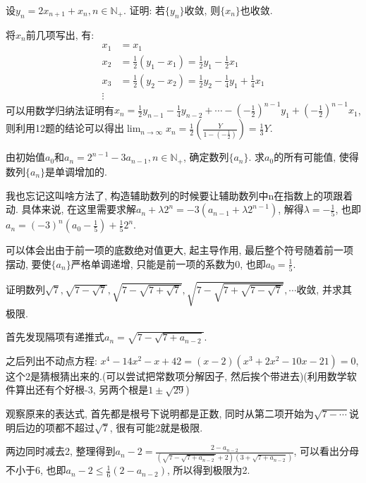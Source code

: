      \begin{exercise}
         设$y_n=2x_{n+1}+x_n, n\in \mathbb{N}_+$. 证明: 若$\{y_n\}$收敛, 则$\{x_n\}$也收敛.
     \end{exercise}
     \begin{solution}
         将$x_n$前几项写出, 有:
         \begin{align*}
             x_1 & =x_1                                                               \\
             x_2 & =\frac{1}{2}(y_1-x_1)=\frac{1}{2}y_1-\frac{1}{2}x_1                \\
             x_3 & =\frac{1}{2}(y_2-x_2)=\frac{1}{2}y_2-\frac{1}{4}y_1+\frac{1}{4}x_1 \\
             \vdots
         \end{align*}
         可以用数学归纳法证明有$x_n=\frac{1}{2}y_{n-1}-\frac{1}{4}y_{n-2}+\cdots-(-\frac{1}{2})^{n-1}y_1+(-\frac{1}{2})^{n-1}x_1$,则利用12题的结论可以得出$\lim_{n\to\infty}x_n=\frac{1}{2}(\frac{Y}{1-(-\frac{1}{2})})=\frac{1}{3}Y$.
     \end{solution}

     \begin{exercise}
         由初始值$a_0$和$a_n=2^{n-1}-3a_{n-1}, n \in \mathbb{N}_+$, 确定数列$\{a_n\}$. 求$a_0$的所有可能值, 使得数列$\{a_n\}$是单调增加的.
     \end{exercise}
     \begin{solution}
         我也忘记这叫啥方法了, 构造辅助数列的时候要让辅助数列中n在指数上的项跟着动. 具体来说, 在这里需要求解$a_n+\lambda 2^n=-3(a_{n-1}+\lambda 2^{n-1})$, 解得$\lambda=-\frac{1}{5}$, 也即$a_n=(-3)^n(a_0-\frac{1}{5})+\frac{1}{5}2^n$.

         可以体会出由于前一项的底数绝对值更大, 起主导作用, 最后整个符号随着前一项摆动, 要使$\{a_n\}$严格单调递增, 只能是前一项的系数为0, 也即$a_0=\frac{1}{5}$.
     \end{solution}

     \begin{exercise}
         证明数列$\sqrt{7}, \sqrt{7-\sqrt{7}}, \sqrt{7-\sqrt{7+\sqrt{7}}}, \sqrt{7-\sqrt{7+\sqrt{7-\sqrt{7}}}}, \cdots$收敛, 并求其极限.
     \end{exercise}
     \begin{solution}
         首先发现隔项有递推式$a_n=\sqrt{7-\sqrt{7+a_{n-2}}}$.

         之后列出不动点方程: $x^4-14x^2-x+42=(x-2)(x^3+2x^2-10x-21)=0$, 这个2是猜根猜出来的.(可以尝试把常数项分解因子, 然后挨个带进去)(利用数学软件算出还有个好根-3, 另两个根是$1\pm \sqrt{29}$)

         观察原来的表达式, 首先都是根号下说明都是正数, 同时从第二项开始为$\sqrt{7-\cdots}$说明后边的项都不超过$\sqrt{7}$, 很有可能2就是极限.

         两边同时减去2, 整理得到$a_n-2=\frac{2-a_{n-2}}{(\sqrt{7-\sqrt{7+a_{n-2}}}+2)(3+\sqrt{7+a_{n-2}})}$, 可以看出分母不小于6, 也即$a_n-2 \leqslant \frac{1}{6}(2-a_{n-2})$, 所以得到极限为2.
     \end{solution}

